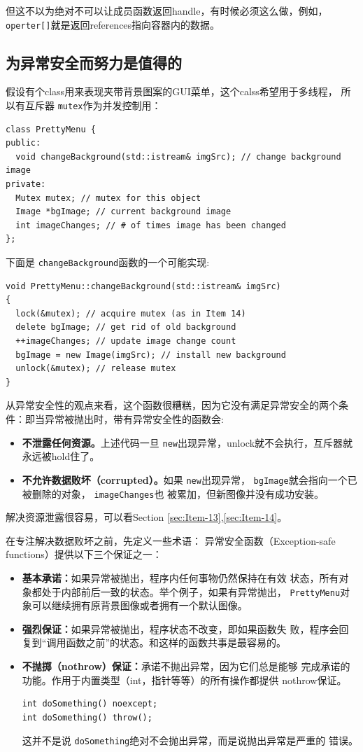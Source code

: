\documentclass[a4paper,twoside]{article}
\theoremstyle{definition}
\theoremstyle{remark}
\numberwithin{equation}{section}
\let\OldTexttt\texttt
\renewcommand{\texttt}[1]{{\color{blue} \OldTexttt{#1}}}
\begin{document}
但这不以为绝对不可以让成员函数返回handle，有时候必须这么做，例如，
\texttt{operter[]}就是返回references指向容器内的数据。

\subsection{为异常安全而努力是值得的}
\label{sec:Item-29}

假设有个class用来表现夹带背景图案的GUI菜单，这个calss希望用于多线程，
所以有互斥器\texttt{mutex}作为并发控制用：
\begin{verbatim}
class PrettyMenu {
public:
  void changeBackground(std::istream& imgSrc); // change background image
private:
  Mutex mutex; // mutex for this object
  Image *bgImage; // current background image
  int imageChanges; // # of times image has been changed
};
\end{verbatim}
下面是\texttt{changeBackground}函数的一个可能实现:
\begin{verbatim}
void PrettyMenu::changeBackground(std::istream& imgSrc)
{
  lock(&mutex); // acquire mutex (as in Item 14)
  delete bgImage; // get rid of old background
  ++imageChanges; // update image change count
  bgImage = new Image(imgSrc); // install new background
  unlock(&mutex); // release mutex
}
\end{verbatim}
从异常安全性的观点来看，这个函数很糟糕，因为它没有满足异常安全的两个条
件：即当异常被抛出时，带有异常安全性的函数会:
\begin{itemize}
\item \textbf{不泄露任何资源。}上述代码一旦\texttt{new}出现异常，unlock就不会执行，互斥器就
  永远被hold住了。
\item \textbf{不允许数据败坏（corrupted）。}如果\texttt{new}出现异常，
  \texttt{bgImage}就会指向一个已被删除的对象，\texttt{imageChanges}也
  被累加，但新图像并没有成功安装。
\end{itemize}

解决资源泄露很容易，可以看Section \ref{sec:Item-13},\ref{sec:Item-14}。

在专注解决数据败坏之前，先定义一些术语：
异常安全函数（Exception-safe functions）提供以下三个保证之一：
\begin{itemize}
\item \textbf{基本承诺：}如果异常被抛出，程序内任何事物仍然保持在有效
  状态，所有对象都处于内部前后一致的状态。举个例子，如果有异常抛出，
  \texttt{PrettyMenu}对象可以继续拥有原背景图像或者拥有一个默认图像。
\item \textbf{强烈保证：}如果异常被抛出，程序状态不改变，即如果函数失
  败，程序会回复到“调用函数之前”的状态。和这样的函数共事是最容易的。
\item \textbf{不抛掷（nothrow）保证：}承诺不抛出异常，因为它们总是能够
  完成承诺的功能。作用于内置类型（int，指针等等）的所有操作都提供
  nothrow保证。
\begin{verbatim}
int doSomething() noexcept;
int doSomething() throw();
\end{verbatim}
这并不是说\texttt{doSomething}绝对不会抛出异常，而是说抛出异常是严重的
错误。
\end{itemize}
\end{document}

